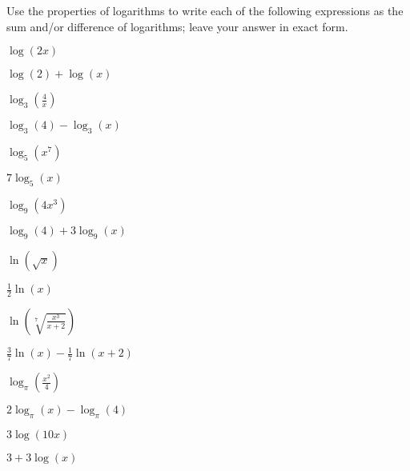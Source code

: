 \begin{exercises}
\begin{problem}
Use the properties of logarithms to write each of the following 
expressions as the sum and/or difference of logarithms; leave
your answer in exact form.
\begin{multicols}{4}
	\begin{subproblem}
		$\log(2x)$ 
		\begin{shortsolution}
			$\log(2)+\log(x)$
		\end{shortsolution}
	\end{subproblem}
	\begin{subproblem}
		$\log_3\left( \frac{4}{x} \right)$ 
		\begin{shortsolution}
			$\log_3(4)-\log_3(x)$
		\end{shortsolution}
	\end{subproblem}
	\begin{subproblem}
		$\log_5(x^7)$ 
		\begin{shortsolution}
			$7\log_5(x)$ 
		\end{shortsolution}
	\end{subproblem}
	\begin{subproblem}
		$\log_9(4x^3)$ 
		\begin{shortsolution}
			$\log_9(4)+3\log_9(x)$
		\end{shortsolution}
	\end{subproblem}
	\begin{subproblem}
		$\ln(\sqrt{x})$ 
		\begin{shortsolution}
			$\frac{1}{2}\ln(x)$
		\end{shortsolution}
	\end{subproblem}
	\begin{subproblem}
		$\ln\left( \sqrt[7]{\frac{x^3}{x+2}} \right)$ 
		\begin{shortsolution}
			$\frac{3}{7}\ln(x)-\frac{1}{7}\ln(x+2)$
		\end{shortsolution}
	\end{subproblem}
	\begin{subproblem}
		$\log_\pi\left( \frac{x^2}{4} \right)$ 
		\begin{shortsolution}
			$2\log_\pi(x)-\log_\pi(4)$
		\end{shortsolution}
	\end{subproblem}
	\begin{subproblem}
		$3\log(10x)$ 
		\begin{shortsolution}
			$3+3\log(x)$
		\end{shortsolution}
	\end{subproblem}
\end{multicols}
\end{problem}


\end{exercises}
